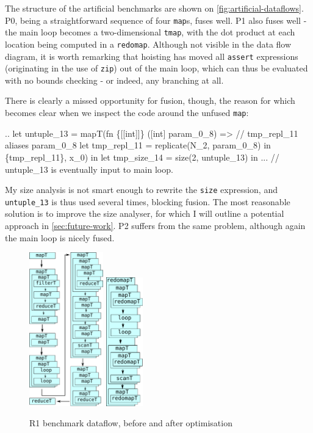 The structure of the artificial benchmarks are shown on
\cref{fig:artificial-dataflows}.  P0, being a straightforward sequence
of four \texttt{map}s, fuses well.  P1 also fuses well - the main loop
becomes a two-dimensional \texttt{tmap}, with the dot product at each
location being computed in a \texttt{redomap}.  Although not visible
in the data flow diagram, it is worth remarking that hoisting has
moved all \texttt{assert} expressions (originating in the use of
\texttt{zip}) out of the main loop, which can thus be evaluated with
no bounds checking - or indeed, any branching at all.

There is clearly a missed opportunity for fusion, though, the reason
for which becomes clear when we inspect the code around the unfused
\texttt{map}:
\begin{colorcode}
..
let {untuple_13} =
  mapT(fn \{[[int]]\} ([int] param_0_8) =>
         // tmp_repl_11 aliases param_0_8
         let tmp_repl_11 = replicate(N_2, param_0_8) in
         \{tmp_repl_11\},
       x_0) in
let tmp_size_14 = size(2, untuple_13) in
... // untuple_13 is eventually input to main loop.
\end{colorcode}
My size analysis is not smart enough to rewrite the \texttt{size}
expression, and \texttt{untuple\_13} is thus used several times,
blocking fusion.  The most reasonable solution is to improve the size
analyser, for which I will outline a potential approach in
\cref{sec:future-work}.  P2 suffers from the same problem, although
again the main loop is nicely fused.

\begin{figure}
\begin{center}
\includegraphics[width=3.2cm]{img/PricingLexiFi-unfused.pdf}
\hspace{1cm}
\includegraphics[width=1.6cm]{img/PricingLexiFi-fused.pdf}
\end{center}
\caption{R1 benchmark dataflow, before and after optimisation}
\label{fig:r1-dataflow}
\end{figure}

